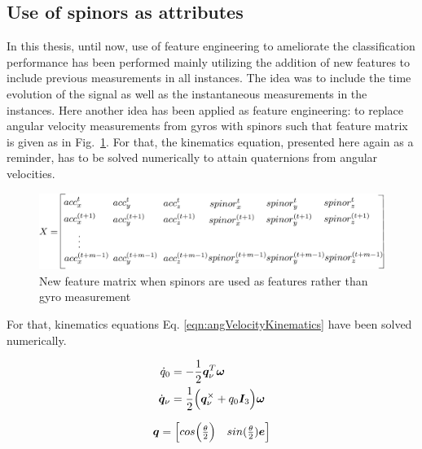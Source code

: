 \subsection{Use of spinors as attributes}
In this thesis, until now, use of feature engineering to ameliorate the classification performance has been performed mainly utilizing the addition of new features to include previous measurements in all instances. The idea was to include the time evolution of the signal as well as the instantaneous measurements in the instances. Here another idea has been applied as feature engineering: to replace angular velocity measurements from gyros with spinors such that feature matrix is given as in Fig.~\ref{fig:featureMatrixSpinors}. For that, the kinematics equation, presented here again as a reminder, has to be solved numerically to attain quaternions from angular velocities.

\begin{figure}[h]
\begin{center}
\includegraphics[width=13cm]{figures/featureMatrixSpinors}    %
\caption{New feature matrix when spinors are used as features rather than gyro measurement} 
\label{fig:featureMatrixSpinors}
\end{center}
\end{figure}

For that, kinematics equations Eq. \ref{eqn:angVelocityKinematics} have been solved numerically.

\begin{align}{\label{eqn:angVelocityKinematics}}
\begin{split}
 \dot{q}_0 &= -\frac{1}{2} \bm{q}_\nu^T \bm{\omega}\\
 \dot{\bm{q}}_\nu &= \frac{1}{2}\Big(\bm{q}_\nu^\times + q_0 \bm{I}_3 \Big) \bm{\omega} \\
\end{split}
\end{align}

\begin{equation}{\label{quaternionDefinition}}
\bm{q} = \begin{bmatrix} 
cos\Big(\frac{\theta}{2}\Big) & sin(\frac{\theta}{2}) \bm{e} \\
\end{bmatrix}
\end{equation}

